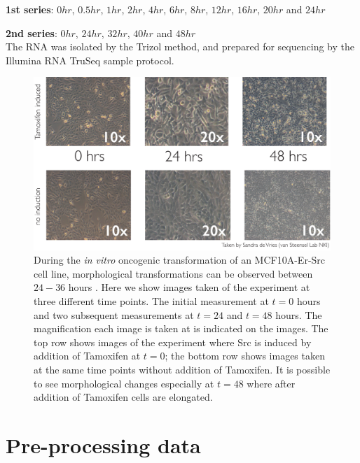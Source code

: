 \textbf{1st series}: $0hr$, $0.5hr$, $1hr$, $2hr$, $4hr$, $6hr$, $8hr$, $12hr$, $16hr$, $20hr$ and $24hr$

\textbf{2nd series}: $0hr$, $24hr$, $32hr$, $40hr$ and $48hr$ \\
The RNA was isolated by the Trizol method, and prepared for sequencing by the Illumina RNA TruSeq sample protocol.



\begin{figure}
  \centering
  \includegraphics[width=1\textwidth]{pics/mcf10a-experiment}
  \caption{During the {\it in vitro} oncogenic transformation of an MCF10A-Er-Src cell line, morphological transformations can be observed between $24-36$ hours \citep{Hirsch:2010ec}. Here we show images taken of the experiment at three different time points. The initial measurement at $t=0$ hours and two subsequent measurements at $t=24$ and $t=48$ hours. The magnification each image is taken at is indicated on the images. The top row shows images of the experiment where Src is induced by addition of Tamoxifen at $t=0$; the bottom row shows images taken at the same time points without addition of Tamoxifen. It is possible to see morphological changes especially at $t=48$ where after addition of Tamoxifen cells are elongated.}
  \label{fig:exp-pics}
\end{figure}

\section{Pre-processing data}
\label{sec:norm-stand}

